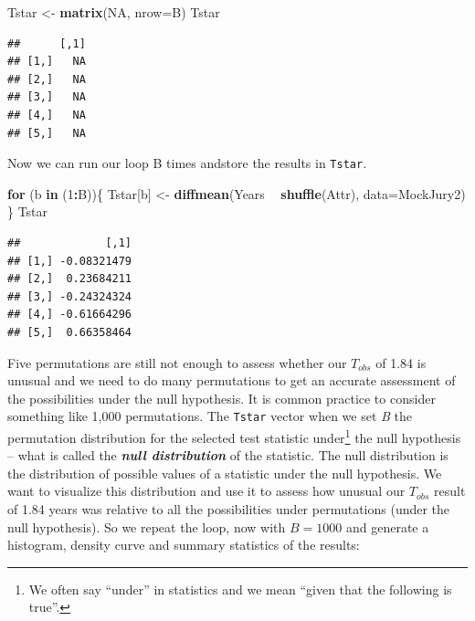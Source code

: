 \documentclass[]{book}
\newenvironment{Shaded}{\begin{snugshade}}{\end{snugshade}}
\newcommand{\KeywordTok}[1]{\textcolor[rgb]{0.13,0.29,0.53}{\textbf{#1}}}
\newcommand{\DataTypeTok}[1]{\textcolor[rgb]{0.13,0.29,0.53}{#1}}
\newcommand{\DecValTok}[1]{\textcolor[rgb]{0.00,0.00,0.81}{#1}}
\newcommand{\StringTok}[1]{\textcolor[rgb]{0.31,0.60,0.02}{#1}}
\newcommand{\OtherTok}[1]{\textcolor[rgb]{0.56,0.35,0.01}{#1}}
\newcommand{\ControlFlowTok}[1]{\textcolor[rgb]{0.13,0.29,0.53}{\textbf{#1}}}
\newcommand{\OperatorTok}[1]{\textcolor[rgb]{0.81,0.36,0.00}{\textbf{#1}}}
\newcommand{\NormalTok}[1]{#1}
\let\rmarkdownfootnote\footnote%
\def\footnote{\protect\rmarkdownfootnote}
\begin{document}
\begin{Shaded}
\begin{Highlighting}[]
\NormalTok{Tstar <-}\StringTok{ }\KeywordTok{matrix}\NormalTok{(}\OtherTok{NA}\NormalTok{, }\DataTypeTok{nrow=}\NormalTok{B)}
\NormalTok{Tstar}
\end{Highlighting}
\end{Shaded}

\begin{verbatim}
##      [,1]
## [1,]   NA
## [2,]   NA
## [3,]   NA
## [4,]   NA
## [5,]   NA
\end{verbatim}

Now we can run our loop B times andstore the results in \texttt{Tstar}.

\begin{Shaded}
\begin{Highlighting}[]
\ControlFlowTok{for}\NormalTok{ (b }\ControlFlowTok{in}\NormalTok{ (}\DecValTok{1}\OperatorTok{:}\NormalTok{B))\{}
\NormalTok{  Tstar[b] <-}\StringTok{ }\KeywordTok{diffmean}\NormalTok{(Years }\OperatorTok{~}\StringTok{ }\KeywordTok{shuffle}\NormalTok{(Attr), }\DataTypeTok{data=}\NormalTok{MockJury2)}
\NormalTok{\}}
\NormalTok{Tstar}
\end{Highlighting}
\end{Shaded}

\begin{verbatim}
##             [,1]
## [1,] -0.08321479
## [2,]  0.23684211
## [3,] -0.24324324
## [4,] -0.61664296
## [5,]  0.66358464
\end{verbatim}

Five permutations are still not enough to assess whether our \(T_{obs}\)
of 1.84 is unusual and we need to do many permutations to get an
accurate assessment of the possibilities under the null hypothesis. It
is common practice to consider something like 1,000 permutations. The
\texttt{Tstar} vector when we set \emph{B} the permutation distribution
for the selected test statistic under\footnote{We often say ``under'' in
  statistics and we mean ``given that the following is true''.} the null
hypothesis -- what is called the \textbf{\emph{null distribution}} of
the statistic. The null distribution is the distribution of possible
values of a statistic under the null hypothesis. We want to visualize
this distribution and use it to assess how unusual our \(T_{obs}\)
result of 1.84 years was relative to all the possibilities under
permutations (under the null hypothesis). So we repeat the loop, now
with \(B=1000\) and generate a histogram, density curve and summary
statistics of the results:
\end{document}
